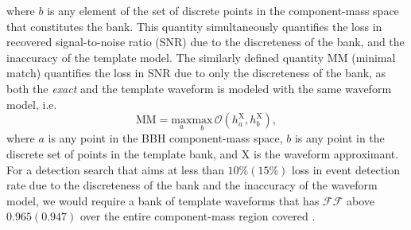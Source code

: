 \documentclass[aps,
prd,
amsmath,
amssymb,
twocolumn,
floatfix,
groupedaddress]{revtex4-1}
\newcommand{\Olap}{\mathcal{O}}
\newcommand{\MM}{\mathrm{MM}}
\newcommand{\X}{\mathrm{X}}
\begin{document}
where $b$ is any element of the set of discrete points in the component-mass space that constitutes the bank. This quantity simultaneously quantifies the loss in recovered signal-to-noise ratio (SNR) due to the discreteness of the bank, and the inaccuracy of the template model. The similarly defined quantity $\MM$ (minimal match) quantifies the loss in SNR due to only the discreteness of the bank, as both the \textit{exact} and the template waveform is modeled with the same waveform model, i.e.
\begin{equation}
\MM = \underset{a}{\textrm{max}}\underset{b}{\textrm{max}}\,\Olap(h^{\X}_a,h^{\X}_b),
\end{equation}
where $a$ is any point in the BBH component-mass space, $b$ is any point in the discrete set of points in the template bank, and $\X$ is the waveform approximant. For a detection search that aims at less than $10\% (15\%)$ loss in event detection rate due to the discreteness of the bank and the inaccuracy of the waveform model, we would require a bank of template waveforms that has $\mathcal{FF}$ above $0.965 (0.947)$ over the entire component-mass region covered \citep{WaveformAccuracy2008,CompTemplates2009}.
\end{document}
